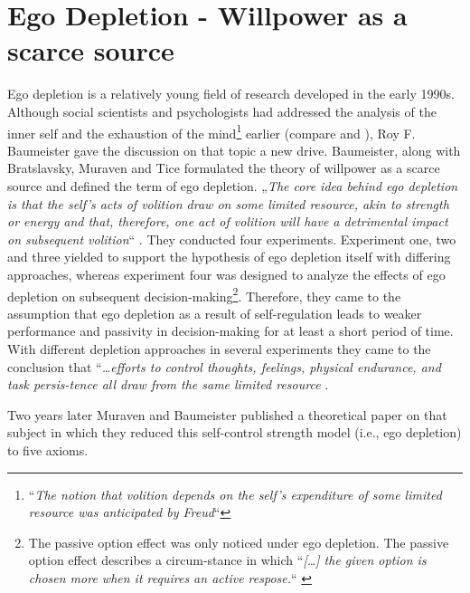 \section{Ego Depletion - Willpower as a scarce source}
Ego depletion is a relatively young field of research developed in the early 1990s. Although social scientists and psychologists  had addressed the analysis of the inner self and the exhaustion of the mind\footnote{“\emph{The notion that volition depends on the self’s expenditure of some limited resource was anticipated by Freud}“\citep{baumeister1998ego}} earlier (compare \citep{ross1975perceived} and \citep{brody1968personality}), Roy F. Baumeister \citep{baumeister1998ego} gave the discussion on that topic a new drive. Baumeister, along with Bratslavsky, Muraven and Tice formulated the theory of willpower as a scarce source and defined the term of ego depletion. „\emph{The core idea behind ego depletion is that the self's acts of volition draw on some limited resource, akin to strength or energy and that, therefore, one act of volition will have a detrimental impact on subsequent volition}“ \citep{baumeister1998ego}. They conducted four experiments. Experiment one, two and three yielded  to support the hypothesis of ego depletion itself with differing approaches, whereas experiment four was designed to analyze the effects of ego depletion on subsequent decision-making\footnote{The passive option effect was only noticed under ego depletion. The passive option effect describes a circum-stance in which “\emph{[\ldots] the given option is chosen more when it requires an active respose.}“ \citep{baumeister1998ego}}. Therefore, they came to the assumption that ego depletion as a result of self-regulation leads to weaker performance and passivity in decision-making for at least a short period of time. With different depletion approaches in several experiments they came to the conclusion that “\emph{\ldots efforts to control thoughts, feelings, physical endurance, and task persis-tence all draw from the same limited resource} \citep{muraven1998self}.\par
Two years later Muraven and Baumeister \citep{muraven2000self} published a theoretical paper on that subject in which they reduced this self-control strength model (i.e., ego depletion) to five axioms.
